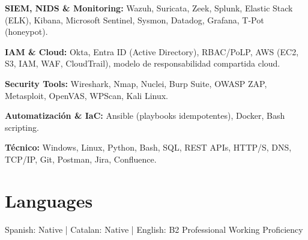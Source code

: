 \documentclass[10pt,a4paper]{article}
\begin{document}
\textbf{SIEM, NIDS \& Monitoring:} Wazuh, Suricata, Zeek, Splunk, Elastic Stack (ELK), Kibana, Microsoft Sentinel, Sysmon, Datadog, Grafana, T-Pot (honeypot).

\textbf{IAM \& Cloud:} Okta, Entra ID (Active Directory), RBAC/PoLP, AWS (EC2, S3, IAM, WAF, CloudTrail), modelo de responsabilidad compartida cloud.

\textbf{Security Tools:} Wireshark, Nmap, Nuclei, Burp Suite, OWASP ZAP, Metasploit, OpenVAS, WPScan, Kali Linux.

\textbf{Automatización \& IaC:} Ansible (playbooks idempotentes), Docker, Bash scripting.

\textbf{Técnico:} Windows, Linux, Python, Bash, SQL, REST APIs, HTTP/S, DNS, TCP/IP, Git, Postman, Jira, Confluence.

\section*{Languages}
Spanish: Native | Catalan: Native | English: B2 Professional Working Proficiency
\end{document}
